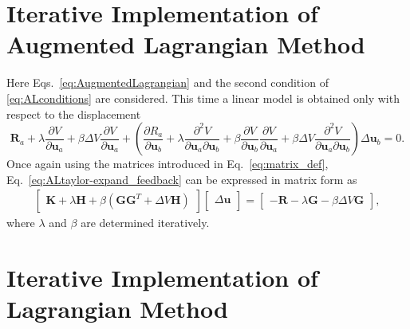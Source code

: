 \section{Iterative Implementation of Augmented Lagrangian Method}

Here Eqs.\ \eqref{eq:AugmentedLagrangian} and the second condition of \eqref{eq:ALconditions} are considered. This time a linear model is obtained only with respect to the displacement
%
\begin{equation}
\pmb{R}_a + \lambda \frac{\partial V}{\partial \pmb{u}_a} + \beta \Delta V \frac{\partial V}{\partial \pmb{u}_a}
%
+ \left(\frac{\partial R_a}{\partial \pmb{u}_b} + \lambda \frac{\partial^2 V}{\partial \pmb{u}_a \partial \pmb{u}_b} + \beta \frac{\partial V}{\partial \pmb{u}_b} \frac{\partial V}{\partial \pmb{u}_a} + \beta \Delta V \frac{\partial^2 V}{\partial \pmb{u}_a \partial \pmb{u}_b} \right) \Delta \pmb{u}_b  =0.
\label{eq:ALtaylor-expand_feedback}
\end{equation}
%
Once again using the matrices introduced in Eq.\ \eqref{eq:matrix_def}, Eq.\ \eqref{eq:ALtaylor-expand_feedback} can be expressed in matrix form as
%
\begin{eqnarray}
\begin{bmatrix}
\textbf{K} + \lambda \textbf{H} + \beta \left(\textbf{G} \textbf{G}^T + \Delta V \textbf{H} \right) 
\end{bmatrix}
%
\begin{bmatrix}
\Delta \textbf{u} \\
\end{bmatrix}
%
= \begin{bmatrix}
-\textbf{R}-\lambda \textbf{G} - \beta \Delta V \textbf{G}
\end{bmatrix},
\label{eq:ALtaylor-expand_matrix_feedback}
\end{eqnarray}
%
where $\lambda$ and $\beta$ are determined iteratively.

\section{Iterative Implementation of Lagrangian Method}

